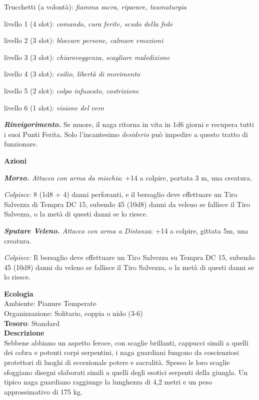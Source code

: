 \begin{multicols}{2}
	Trucchetti (a volontà): \textit{fiamma sacra, riparare, taumaturgia}

	livello 1 (4 slot): \textit{comando, cura ferite, scudo della fede}

	livello 2 (3 slot): \textit{bloccare persone, calmare emozioni}

	livello 3 (3 slot): \textit{chiaroveggenza, scagliare maledizione}

	livello 4 (3 slot): \textit{esilio, libertà di movimento}

	livello 5 (2 slot): \textit{colpo infuocato, costrizione}

	livello 6 (1 slot): \textit{visione del vero}

	\textit{\textbf{Rinvigorimento.}} Se muore, il naga ritorna in vita in 1d6 giorni e recupera tutti i suoi Punti Ferita. Solo l'incantesimo \textit{desiderio} può impedire a questo tratto di funzionare.

	\textbf{Azioni}

	\textit{\textbf{Morso.} Attacco con arma da mischia}: +14 a colpire, portata 3 m, una creatura.

	\textit{Colpisce:} 8 (1d8 + 4) danni perforanti, e il bersaglio deve effettuare un Tiro Salvezza di Tempra DC 15, subendo 45 (10d8) danni da veleno se fallisce il Tiro Salvezza, o la metà di questi danni se lo riesce.

	\textit{\textbf{Sputare Veleno.} Attacco con arma a Distanza}: +14 a colpire, gittata 5m, una creatura.

	\textit{Colpisce:} Il bersaglio deve effettuare un Tiro Salvezza su Tempra DC 15, subendo 45 (10d8) danni da veleno se fallisce il Tiro Salvezza, o la metà di questi danni se lo riesce.

	\textbf{Ecologia}\\
	Ambiente: Pianure Temperate\\
	Organizzazione: Solitario, coppia o nido (3-6)\\
	\textbf{Tesoro}: Standard\\
	\textbf{Descrizione}\\
	Sebbene abbiano un aspetto feroce, con scaglie brillanti, cappucci simili a quelli dei cobra e potenti corpi serpentini, i naga guardiani fungono da coscienziosi protettori di luoghi di eccezionale potere e sacralità. Spesso le loro scaglie sfoggiano disegni elaborati simili a quelli degli esotici serpenti della giungla. Un tipico naga guardiano raggiunge la lunghezza di 4,2 metri e un peso approssimativo di 175 kg.


\end{multicols}
